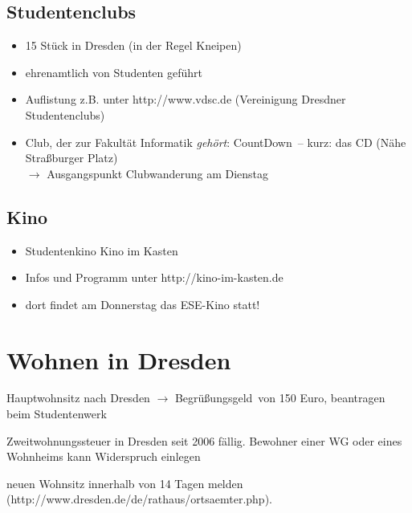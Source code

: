 \documentclass[a4paper,12pt]{report}
\begin{document}
\subsection{Studentenclubs}
\begin{itemize}
	\item 15 Stück in Dresden (in der Regel Kneipen)
	\item ehrenamtlich von Studenten geführt
	\item  Auflistung z.B. unter http://www.vdsc.de (Vereinigung Dresdner Studentenclubs)
	\item Club, der zur Fakultät Informatik \textit{gehört}: \glqq CountDown\grqq\ -- kurz: das CD (Nähe Straßburger Platz)\\
	$\rightarrow$ Ausgangspunkt Clubwanderung am Dienstag
\end{itemize}

\subsection{Kino}
\begin{itemize}
	\item Studentenkino \glqq Kino im Kasten\grqq
	\item Infos und Programm unter http://kino-im-kasten.de
	\item dort findet am Donnerstag das ESE-Kino statt!
\end{itemize}


\section{Wohnen in Dresden}
\begin{itemize*}
  \item Hauptwohnsitz nach Dresden $\rightarrow$ \glqq Begrüßungsgeld\grqq\ von 150 Euro, beantragen beim Studentenwerk
  \item Zweitwohnungssteuer in Dresden seit 2006 fällig. Bewohner einer WG oder eines Wohnheims kann Widerspruch einlegen
	\item neuen Wohnsitz innerhalb von 14 Tagen melden\\
  (http://www.dresden.de/de/rathaus/ortsaemter.php).
\end{itemize*}
\end{document}
